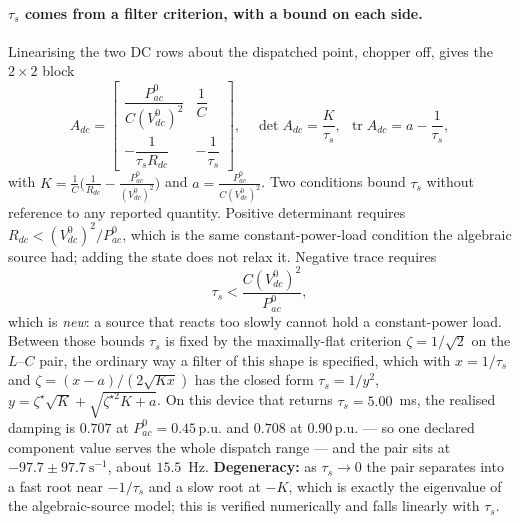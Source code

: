 \documentclass[12pt,a4paper]{article}
\theoremstyle{remark}
\newcommand{\pu}{\,\mathrm{p.u.}}
\begin{document}
\paragraph{$\tau_s$ comes from a filter criterion, with a bound on each side.}
Linearising the two DC rows about the dispatched point, chopper off, gives the
$2\times2$ block
\begin{equation}
  A_{dc}=\begin{bmatrix}
    \dfrac{P_{ac}^{0}}{C(V_{dc}^{0})^{2}} & \dfrac1C\\[8pt]
    -\dfrac{1}{\tau_sR_{dc}} & -\dfrac1{\tau_s}\end{bmatrix},
  \quad
  \det A_{dc}=\frac{K}{\tau_s},\ \ \operatorname{tr}A_{dc}=a-\frac1{\tau_s},
  \label{eq:dcblock}
\end{equation}
with $K=\frac1C\bigl(\frac1{R_{dc}}-\frac{P_{ac}^{0}}{(V_{dc}^{0})^{2}}\bigr)$ and
$a=\frac{P_{ac}^{0}}{C(V_{dc}^{0})^{2}}$. Two conditions bound $\tau_s$ without
reference to any reported quantity. Positive determinant requires
$R_{dc}<(V_{dc}^{0})^{2}/P_{ac}^{0}$, which is the same constant-power-load
condition the algebraic source had; adding the state does not relax it. Negative
trace requires
\begin{equation}
  \tau_s<\frac{C(V_{dc}^{0})^{2}}{P_{ac}^{0}},
  \label{eq:dctau}
\end{equation}
which is \emph{new}: a source that reacts too slowly cannot hold a constant-power
load. Between those bounds $\tau_s$ is fixed by the maximally-flat criterion
$\zeta=1/\sqrt2$ on the $L$--$C$ pair, the ordinary way a filter of this shape is
specified, which with $x=1/\tau_s$ and $\zeta=(x-a)/(2\sqrt{Kx})$ has the closed
form $\tau_s=1/y^2$, $y=\zeta^{\star}\sqrt K+\sqrt{\zeta^{\star2}K+a}$. On this
device that returns $\tau_s=5.00$~ms, the realised damping is $0.707$ at
$P_{ac}^{0}=0.45\pu$ and $0.708$ at $0.90\pu$ --- so one declared component value
serves the whole dispatch range --- and the pair sits at
$-97.7\pm97.7\ \mathrm{s^{-1}}$, about $15.5$~Hz. \textbf{Degeneracy:} as
$\tau_s\to0$ the pair separates into a fast root near $-1/\tau_s$ and a slow root
at $-K$, which is exactly the eigenvalue of the algebraic-source model; this is
verified numerically and falls linearly with $\tau_s$.
\end{document}
